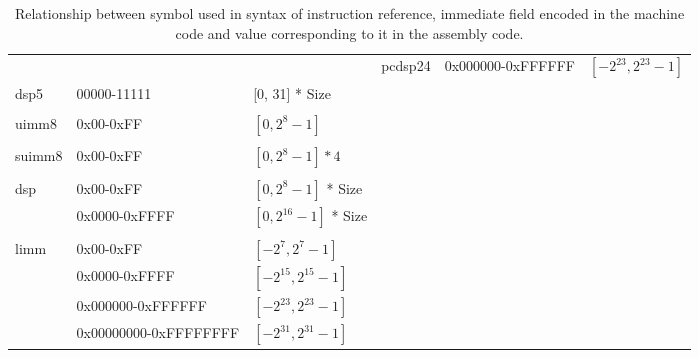 \begin{table}
\begin{subtable}{\linewidth}
\begin{center}
\begin{tabular}{lll|lll}
            &                       &                          & pcdsp24   & 0x000000-0xFFFFFF     & $[-2^{23}, 2^{23}-1]$      \\
dsp5        & 00000-11111           & [0, 31] * Size           &           &                       &                            \\
            &                       &                          &           &                       &                            \\
uimm8       & 0x00-0xFF             & $[0, 2^{8}-1]$           &           &                       &                            \\
            &                       &                          &           &                       &                            \\
suimm8      & 0x00-0xFF             & $[0, 2^{8}-1] * 4$       &           &                       &                            \\
            &                       &                          &           &                       &                            \\
dsp         & 0x00-0xFF             & $[0, 2^{8}-1]$ * Size    &           &                       &                            \\
            & 0x0000-0xFFFF         & $[0, 2^{16}-1]$ * Size   &           &                       &                            \\
            &                       &                          &           &                       &                            \\
limm        & 0x00-0xFF             & $[-2^{7}, 2^{7}-1]$      &           &                       &                            \\
            & 0x0000-0xFFFF         & $[-2^{15}, 2^{15}-1]$    &           &                       &                            \\
            & 0x000000-0xFFFFFF     & $[-2^{23}, 2^{23}-1]$    &           &                       &                            \\
            & 0x00000000-0xFFFFFFFF & $[-2^{31}, 2^{31}-1]$    &           &                       &                            \\ \hline
\end{tabular}    
\end{center}
\captionsetup{font=scriptsize, labelfont=scriptsize}
\caption{Relationship between symbol used in syntax of instruction reference, immediate field 
encoded in the machine code and value corresponding to it in the assembly code.}
\end{subtable}


\end{table}
